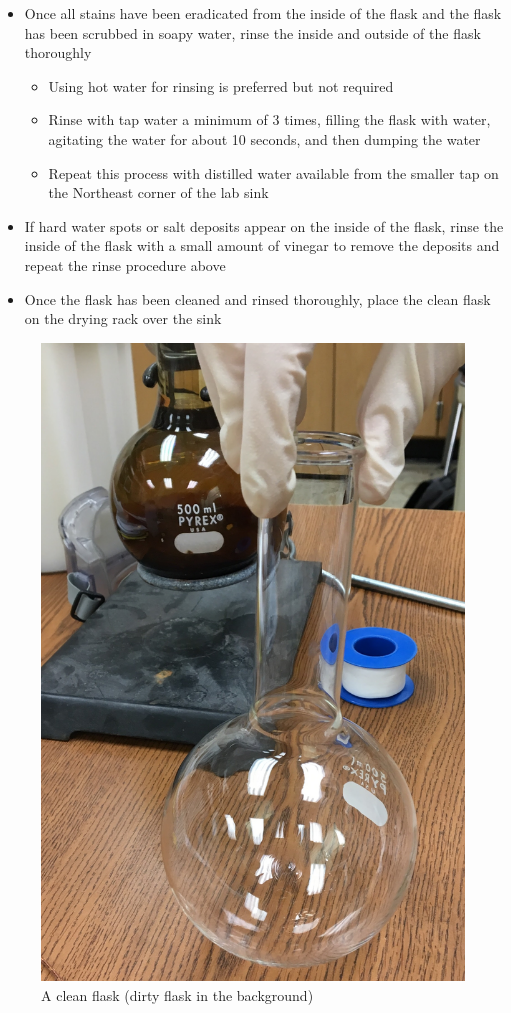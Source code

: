 \documentclass[letterpaper,11pt]{article}
\begin{document}
\begin{itemize}
\begin{itemize}
        \item Once all stains have been eradicated from the inside of the flask
            and the flask has been scrubbed in soapy water, rinse the inside and
            outside of the flask thoroughly
            \begin{itemize}
            \item Using hot water for rinsing is preferred but not required
            \item Rinse with tap water a minimum of 3 times, filling the flask
                with water, agitating the water for about 10 seconds, and then 
                dumping the water
            \item Repeat this process with distilled water available from the 
                smaller tap on the Northeast corner of the lab sink
            \end{itemize}
        
        \item If hard water spots or salt deposits appear on the inside of the 
            flask, rinse the inside of the flask with a small amount of vinegar
            to remove the deposits and repeat the rinse procedure above
        \item Once the flask has been cleaned and rinsed thoroughly, place the 
            clean flask on the drying rack over the sink
        \end{itemize}        
    \end{itemize}

\begin{figure}[H]
\centering
\includegraphics[width=.25\textwidth]{clean_dirty_flask.jpg}
\caption{A clean flask (dirty flask in the background)}
\label{fig:clean_dirty}
\end{figure}  

\newpage 
\end{document}
